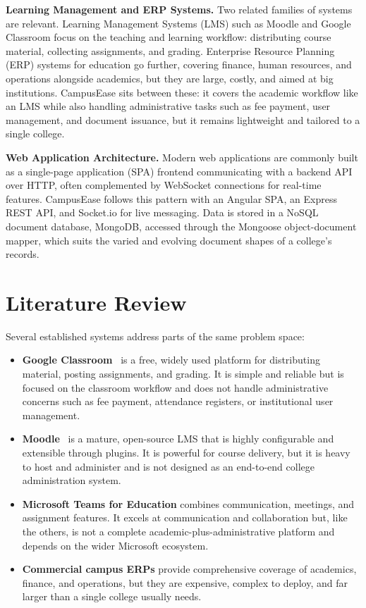 \documentclass[12pt,a4paper]{report}
\begin{document}
\textbf{Learning Management and ERP Systems.}
Two related families of systems are relevant. Learning Management Systems (LMS) such as Moodle and Google Classroom focus on the teaching and learning workflow: distributing course material, collecting assignments, and grading. Enterprise Resource Planning (ERP) systems for education go further, covering finance, human resources, and operations alongside academics, but they are large, costly, and aimed at big institutions. CampusEase sits between these: it covers the academic workflow like an LMS while also handling administrative tasks such as fee payment, user management, and document issuance, but it remains lightweight and tailored to a single college.

\textbf{Web Application Architecture.}
Modern web applications are commonly built as a single-page application (SPA) frontend communicating with a backend API over HTTP, often complemented by WebSocket connections for real-time features. CampusEase follows this pattern with an Angular SPA, an Express REST API, and Socket.io for live messaging. Data is stored in a NoSQL document database, MongoDB, accessed through the Mongoose object-document mapper, which suits the varied and evolving document shapes of a college's records.

\section{Literature Review}

Several established systems address parts of the same problem space:

\begin{itemize}
    \item \textbf{Google Classroom}~\cite{googleclassroom} is a free, widely used platform for distributing material, posting assignments, and grading. It is simple and reliable but is focused on the classroom workflow and does not handle administrative concerns such as fee payment, attendance registers, or institutional user management.
    \item \textbf{Moodle}~\cite{moodle} is a mature, open-source LMS that is highly configurable and extensible through plugins. It is powerful for course delivery, but it is heavy to host and administer and is not designed as an end-to-end college administration system.
    \item \textbf{Microsoft Teams for Education} combines communication, meetings, and assignment features. It excels at communication and collaboration but, like the others, is not a complete academic-plus-administrative platform and depends on the wider Microsoft ecosystem.
    \item \textbf{Commercial campus ERPs} provide comprehensive coverage of academics, finance, and operations, but they are expensive, complex to deploy, and far larger than a single college usually needs.
\end{itemize}
\end{document}
